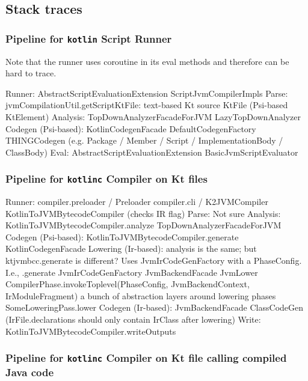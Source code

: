 \documentclass{article}
\begin{document}
\subsection{Stack traces}

\subsubsection{Pipeline for \texttt{kotlin} Script Runner}
Note that the runner uses coroutine in its eval methods and therefore can be hard to trace.

Runner: AbstractScriptEvaluationExtension \textSafeTo ScriptJvmCompilerImpls
Parse: jvmCompilationUtil.getScriptKtFile: text-based Kt source \textSafeTo KtFile (Psi-based KtElement)
Analysis: TopDownAnalyzerFacadeForJVM \textSafeTo LazyTopDownAnalyzer
Codegen (Psi-based): KotlinCodegenFacade \textSafeTo DefaultCodegenFactory \textSafeTo THINGCodegen (e.g. Package / Member / Script / ImplementationBody / ClassBody)
Eval: AbstractScriptEvaluationExtension \textSafeTo BasicJvmScriptEvaluator

\subsubsection{Pipeline for \texttt{kotlinc} Compiler on Kt files}

 Runner: compiler.preloader / Preloader \textSafeTo compiler.cli / K2JVMCompiler \textSafeTo KotlinToJVMBytecodeCompiler (checks IR flag)
Parse: Not sure
Analysis: KotlinToJVMBytecodeCompiler.analyze \textSafeTo TopDownAnalyzerFacadeForJVM
Codegen (Psi-based): KotlinToJVMBytecodeCompiler.generate \textSafeTo KotlinCodegenFacade
Lowering (Ir-based): analysis is the same; but ktjvmbcc.generate is different? Uses JvmIrCodeGenFactory with a PhaseConfig. I.e., .generate \textSafeTo JvmIrCodeGenFactory \textSafeTo JvmBackendFacade \textSafeTo JvmLower \textSafeTo CompilerPhase.invokeToplevel(PhaseConfig, JvmBackendContext, IrModuleFragment) \textSafeTo a bunch of abstraction layers around lowering phases \textSafeTo SomeLoweringPass.lower
Codegen (Ir-based): JvmBackendFacade \textSafeTo ClassCodeGen (IrFile.declarations should only contain IrClass after lowering)
Write: KotlinToJVMBytecodeCompiler.writeOutputs

\subsubsection{Pipeline for \texttt{kotlinc} Compiler on Kt file calling compiled Java code}
\end{document}
